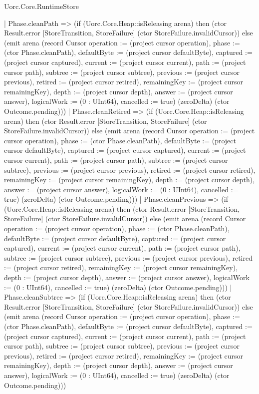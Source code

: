 \begin{lexlean}{Uorc.Core.RuntimeStore}
\begin{semanticmodule}
{    | Phase.cleanPath => (if (Uorc.Core.Heap::isReleasing arena) then (ctor Result.error [StoreTransition, StoreFailure] (ctor StoreFailure.invalidCursor)) else (emit arena (record Cursor {operation := (project cursor operation), phase := (ctor Phase.cleanPath), defaultByte := (project cursor defaultByte), captured := (project cursor captured), current := (project cursor current), path := (project cursor path), subtree := (project cursor subtree), previous := (project cursor previous), retired := (project cursor retired), remainingKey := (project cursor remainingKey), depth := (project cursor depth), answer := (project cursor answer), logicalWork := (0 : UInt64), cancelled := true}) (zeroDelta) (ctor Outcome.pending)))
    | Phase.cleanRetired => (if (Uorc.Core.Heap::isReleasing arena) then (ctor Result.error [StoreTransition, StoreFailure] (ctor StoreFailure.invalidCursor)) else (emit arena (record Cursor {operation := (project cursor operation), phase := (ctor Phase.cleanPath), defaultByte := (project cursor defaultByte), captured := (project cursor captured), current := (project cursor current), path := (project cursor path), subtree := (project cursor subtree), previous := (project cursor previous), retired := (project cursor retired), remainingKey := (project cursor remainingKey), depth := (project cursor depth), answer := (project cursor answer), logicalWork := (0 : UInt64), cancelled := true}) (zeroDelta) (ctor Outcome.pending)))
    | Phase.cleanPrevious => (if (Uorc.Core.Heap::isReleasing arena) then (ctor Result.error [StoreTransition, StoreFailure] (ctor StoreFailure.invalidCursor)) else (emit arena (record Cursor {operation := (project cursor operation), phase := (ctor Phase.cleanPath), defaultByte := (project cursor defaultByte), captured := (project cursor captured), current := (project cursor current), path := (project cursor path), subtree := (project cursor subtree), previous := (project cursor previous), retired := (project cursor retired), remainingKey := (project cursor remainingKey), depth := (project cursor depth), answer := (project cursor answer), logicalWork := (0 : UInt64), cancelled := true}) (zeroDelta) (ctor Outcome.pending)))
    | Phase.cleanSubtree => (if (Uorc.Core.Heap::isReleasing arena) then (ctor Result.error [StoreTransition, StoreFailure] (ctor StoreFailure.invalidCursor)) else (emit arena (record Cursor {operation := (project cursor operation), phase := (ctor Phase.cleanPath), defaultByte := (project cursor defaultByte), captured := (project cursor captured), current := (project cursor current), path := (project cursor path), subtree := (project cursor subtree), previous := (project cursor previous), retired := (project cursor retired), remainingKey := (project cursor remainingKey), depth := (project cursor depth), answer := (project cursor answer), logicalWork := (0 : UInt64), cancelled := true}) (zeroDelta) (ctor Outcome.pending)))
}
\end{semanticmodule}
\end{lexlean}
